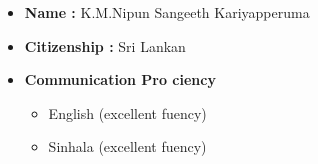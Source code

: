 \documentclass[10pt, letterpaper]{article}
\newenvironment{highlights}{
    \begin{itemize}[
        topsep=0.10 cm,
        parsep=0.10 cm,
        partopsep=0pt,
        itemsep=0pt,
        leftmargin=0.4 cm + 10pt
    ]
}{
    \end{itemize}
} %
\begin{document}
 \begin{highlights}
                \item \textbf{Name :} K.M.Nipun Sangeeth Kariyapperuma 
                \item \textbf{Citizenship :} Sri Lankan
                  \item \textbf{Communication Pro ciency} 
                  
                 \begin{itemize}
                 \item  English (excellent fuency)
                    \item Sinhala (excellent fuency)
                 \end{itemize}
              
          
            \end{highlights}
        
\end{document}
